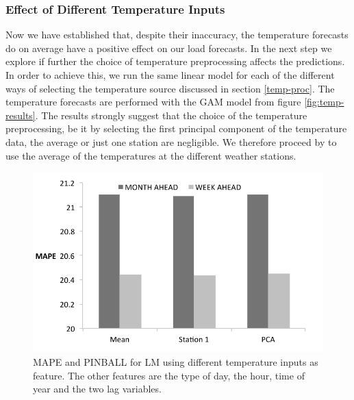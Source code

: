 \documentclass[conference]{IEEEtran}
\begin{document}
\subsubsection{Effect of Different Temperature Inputs}
Now we have established that, despite their inaccuracy, the temperature forecasts do on average have a positive effect on our load forecasts. In the next step we explore if further the choice of temperature preprocessing affects the predictions. In order to achieve this, we run the same linear model for each of the different ways of selecting the temperature source discussed in section \ref{temp-proc}. The temperature forecasts are performed with the GAM model from figure \ref{fig:temp-results}. The results strongly suggest that the choice of the temperature preprocessing, be it by selecting the first principal component of the temperature data, the average or just one station are negligible. We therefore proceed by to use the average of the temperatures at the different weather stations.
\begin{figure}[!ht]
\centering
\includegraphics[width=\linewidth]{gfx/results/temp/MAPE-temp-source-effect.pdf}
\caption{MAPE and PINBALL for LM using different temperature inputs as feature. The other features are the type of day, the hour, time of year and the two lag variables.}
\label{fig:load-temp-source}
\end{figure}
\end{document}
